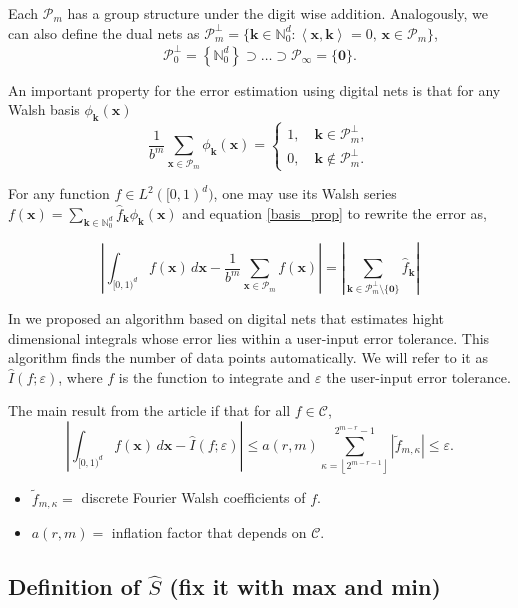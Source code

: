 \documentclass[]{elsarticle}
\theoremstyle{definition}
\newcommand{\cube}{[0,1)^d}
\newcommand{\bvec}[1]{\boldsymbol{#1}}
\newcommand{\vx}{\bvec{x}}
\newcommand{\vk}{\bvec{k}}
\newcommand{\hf}{\hat{f}}
\newcommand{\tf}{\tilde{f}}
\newcommand{\vzero}{\bvec{0}}
\newcommand{\naturals}{\mathbb{N}}
\newcommand{\ip}[3][{}]{\ensuremath{\left \langle #2, #3 \right \rangle_{#1}}}
\def\abs#1{\ensuremath{\left \lvert #1 \right \rvert}}
\begin{document}
Each $\mathcal{P}_m$ has a group structure under the digit wise addition. Analogously, we can also define the dual nets as $\mathcal{P}_m^\perp=\{\vk\in\mathbb{N}_0^d:\ip{\vx}{\vk}=0,\, \vx\in\mathcal{P}_m\}$,
\[
\mathcal{P}_0^\perp=\left\{\mathbb{N}_0^d\right\}\supset\dots\supset\mathcal{P}_\infty=\{\bvec{0}\}.
\]

An important property for the error estimation using digital nets is that for any Walsh basis $\phi_{\vk}(\vx)$
\begin{equation}\label{basis_prop}
\frac{1}{b^m}\sum_{\vx\in\mathcal{P}_m}\phi_{\vk}(\vx)=
\begin{cases}
1,\quad \vk\in\mathcal{P}_m^\perp, \\
0,\quad \vk\notin\mathcal{P}_m^\perp.
\end{cases}
\end{equation}

For any function $f\in L^2(\cube)$, one may use its Walsh series $f(\vx)=\sum_{\vk\in\naturals_0^d}\hf_{\vk}\phi_{\vk}(\vx)$ and equation \eqref{basis_prop} to rewrite the error as,


\[
\abs{\int_{\cube} f(\vx)\,d\vx - \frac{1}{b^m}\sum_{\vx\in\mathcal{P}_m}f(\vx)}=\abs{\sum_{\vk\in\mathcal{P}_m^\perp\setminus\{\vzero\}}\hf_{\vk}}
\]

In \cite{HicJim} we proposed an algorithm based on digital nets that estimates hight dimensional integrals whose error lies within a user-input error tolerance. This algorithm finds the number of data points automatically. We will refer to it as $\widehat{I}(f;\varepsilon)$, where $f$ is the function to integrate and $\varepsilon$ the user-input error tolerance.

The main result from the article if that for all $f\in\mathcal{C}$,
\[
\abs{\int_{\cube} f(\vx)\,d\vx - \widehat{I}(f;\varepsilon)}\leq a(r,m)\sum_{\kappa=\left \lfloor 2^{m-r-1}\right \rfloor}^{2^{m-r}-1} \abs{\tf_{m,\kappa}}\leq \varepsilon.
\]
\begin{itemize}
\item $\tf_{m,\kappa}=$ discrete Fourier Walsh coefficients of $f$.
\item $a(r,m)=$ inflation factor that depends on $\mathcal{C}$.
\end{itemize}

\subsection{Definition of $\widehat{S}$ (fix it with max and min)}
\end{document}
